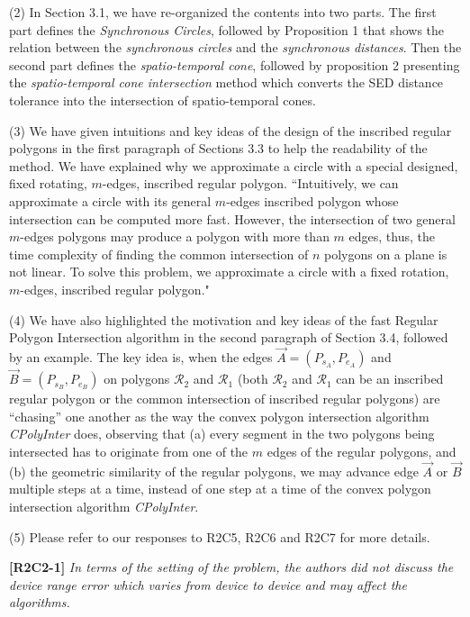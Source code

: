 \documentclass{letter}
\newcommand{\vv}{\overrightarrow}
\begin{document}
(2) In Section 3.1, we have re-organized the contents into two parts. The first part defines the \emph{Synchronous Circles}, followed by Proposition 1 that shows the relation between the \textit{synchronous circles} and the \textit{synchronous distances}. Then the second part defines the \textit{spatio-temporal cone}, followed by proposition 2 presenting the \textit{spatio-temporal cone intersection} method which converts the SED distance tolerance into the intersection of spatio-temporal cones.

(3) We have given intuitions and key ideas of the design of the inscribed regular polygons in the first paragraph of Sections 3.3 to help the readability of the method. We have explained why we approximate a circle with a special designed, fixed rotating, $m$-edges, inscribed regular polygon. ``Intuitively, we can approximate a circle with its general $m$-edges inscribed polygon {whose intersection can be computed more fast}. However, the intersection of two general $m$-edges polygons may produce a polygon with more than $m$ edges, thus, the time complexity of finding the common intersection of $n$ polygons on a plane is not linear. To solve this problem, we approximate a circle with a fixed rotation, $m$-edges, inscribed regular polygon."

(4) We have also highlighted the motivation and key ideas of the fast Regular Polygon Intersection algorithm in the second paragraph of Section 3.4, followed by an example. The key idea is, when the edges $\vv{A} = (P_{s_A}, P_{e_A})$ and $\vv{B} = (P_{s_B}, P_{e_B})$ on polygons $\mathcal{R}_2$ and $\mathcal{R}_1$ (both $\mathcal{R}_2$ and $\mathcal{R}_1$ can be an inscribed regular polygon or the common intersection of inscribed regular polygons) are ``chasing'' one another as the way the convex polygon intersection algorithm \emph{CPolyInter} does, 
observing that (a) every segment in the two polygons being intersected has to originate from one of the $m$ edges of the regular polygons, and (b) the geometric similarity of the regular polygons, 
we may advance edge $\vv{A}$ or $\vv{B}$ multiple steps at a time, instead of one step at a time of the convex polygon intersection algorithm \emph{CPolyInter}.

(5) Please refer to our responses to R2C5, R2C6 and R2C7 for more details.

\textbf{[R2C2-1]} \emph{In terms of the setting of the problem, the authors did not discuss the device range error which varies from device to device and may affect the algorithms.}
\end{document}
